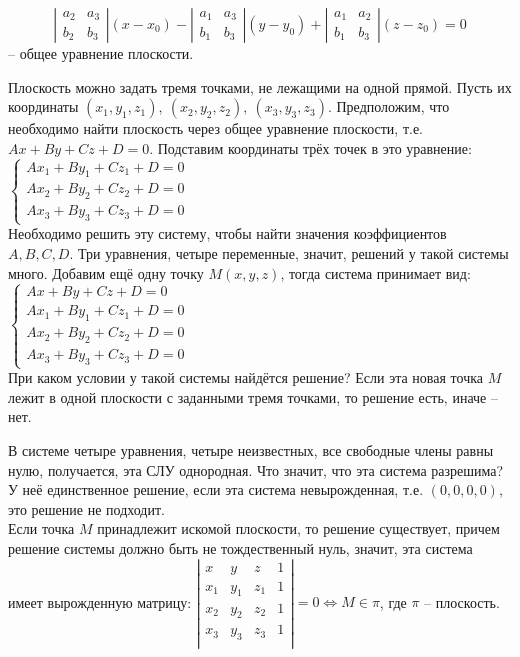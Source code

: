 	\begin{Def}
		$$\left|\begin{array}{cccc}
			a_2 & a_3 \\ 
			b_2 & b_3
			\end{array}\right| (x-x_0) - 
		\left|\begin{array}{cccc}
			a_1 & a_3 \\ 
			b_1 & b_3
			\end{array}\right| (y- y_0) + 
		\left|\begin{array}{cccc}
			a_1 & a_2 \\ 
			b_1 & b_3
			\end{array}\right| (z-z_0) = 0$$ -- общее уравнение плоскости.
	\end{Def}

	Плоскость можно задать тремя точками, не лежащими на одной прямой. Пусть их координаты $(x_1, y_1, z_1), \ (x_2, y_2, z_2), \ (x_3, y_3, z_3)$. Предположим, что необходимо найти плоскость через общее уравнение плоскости, т.е. $Ax + By + Cz + D = 0$. Подставим координаты трёх точек в это уравнение:
	$ \begin{cases}
		Ax_1 + By_1 + Cz_1 + D = 0\\
		Ax_2 + By_2 + Cz_2 + D = 0\\
		Ax_3 + By_3 + Cz_3 + D = 0
	\end{cases} $ \\
	Необходимо решить эту систему, чтобы найти значения коэффициентов $A, B, C, D$. Три уравнения, четыре переменные, значит, решений у такой системы много.
	Добавим ещё одну точку $M(x, y, z)$, тогда система принимает вид:
	$ \begin{cases}
		Ax + By + Cz + D = 0 \\
		Ax_1 + By_1 + Cz_1 + D = 0\\
		Ax_2 + By_2 + Cz_2 + D = 0\\
		Ax_3 + By_3 + Cz_3 + D = 0
	\end{cases} $ \\
	При каком условии у такой системы найдётся решение? Если эта новая точка $M$ лежит в одной плоскости с заданными тремя точками, то решение есть, иначе -- нет.

	В системе четыре уравнения, четыре неизвестных, все свободные члены равны нулю, получается, эта СЛУ однородная. Что значит, что эта система разрешима? У неё единственное решение, если эта система невырожденная, т.е. $(0, 0, 0, 0)$, это решение не подходит. \\
	Если точка $M$ принадлежит искомой плоскости, то решение существует, причем решение системы должно быть не тождественный нуль, значит, эта система имеет вырожденную матрицу:
	$\left|\begin{array}{cccc}
		x & y & z & 1 \\ 
		x_1 & y_1 & z_1 & 1 \\
		x_2 & y_2 & z_2 & 1 \\
		x_3 & y_3 & z_3 & 1 \\
		\end{array}\right| = 0 \Leftrightarrow M \in \pi$, где $\pi$ -- плоскость.

